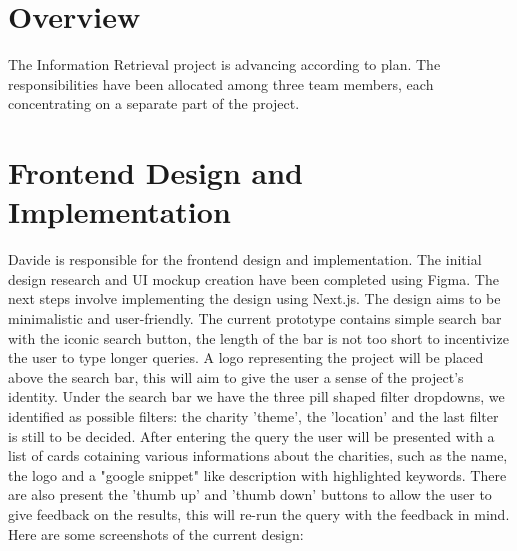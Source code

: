 \documentclass[unicode,9pt,a4paper,oneside,numbers=endperiod,openany]{scrartcl}
\begin{document}
\setassignment
{}

\newline

\section{Overview}
The Information Retrieval project is advancing according to plan. The responsibilities have been allocated among three team members, each concentrating on a separate part of the project.

\section{Frontend Design and Implementation}
Davide is responsible for the frontend design and implementation. The initial design research and UI mockup creation have been completed using Figma. The next steps involve implementing the design using Next.js.
The design aims to be minimalistic and user-friendly.
The current prototype contains simple search bar with the iconic search button, the length of the bar is not too short to incentivize the user to type longer queries.
A logo representing the project will be placed above the search bar, this will aim to give the user a sense of the project's identity.
Under the search bar we have the three pill shaped filter dropdowns, we identified as possible filters: the charity 'theme', the 'location' and the last filter is still to be decided.
After entering the query the user will be presented with a list of cards cotaining various informations about the charities, such as the name, the logo and a "google snippet" like description with highlighted keywords.
There are also present the 'thumb up' and 'thumb down' buttons to allow the user to give feedback on the results, this will re-run the query with the feedback in mind.
\\Here are some screenshots of the current design:
\end{document}
